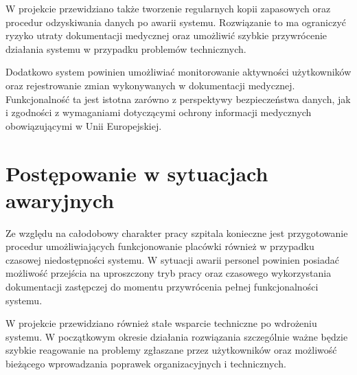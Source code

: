W projekcie przewidziano także tworzenie regularnych kopii zapasowych oraz procedur odzyskiwania danych po awarii systemu. Rozwiązanie to ma ograniczyć ryzyko utraty dokumentacji medycznej oraz umożliwić szybkie przywrócenie działania systemu w przypadku problemów technicznych.

Dodatkowo system powinien umożliwiać monitorowanie aktywności użytkowników oraz rejestrowanie zmian wykonywanych w dokumentacji medycznej. Funkcjonalność ta jest istotna zarówno z perspektywy bezpieczeństwa danych, jak i zgodności z wymaganiami dotyczącymi ochrony informacji medycznych obowiązującymi w Unii Europejskiej.

\section{Postępowanie w sytuacjach awaryjnych}

Ze względu na całodobowy charakter pracy szpitala konieczne jest przygotowanie procedur umożliwiających funkcjonowanie placówki również w przypadku czasowej niedostępności systemu. W sytuacji awarii personel powinien posiadać możliwość przejścia na uproszczony tryb pracy oraz czasowego wykorzystania dokumentacji zastępczej do momentu przywrócenia pełnej funkcjonalności systemu.

W projekcie przewidziano również stałe wsparcie techniczne po wdrożeniu systemu. W początkowym okresie działania rozwiązania szczególnie ważne będzie szybkie reagowanie na problemy zgłaszane przez użytkowników oraz możliwość bieżącego wprowadzania poprawek organizacyjnych i technicznych.